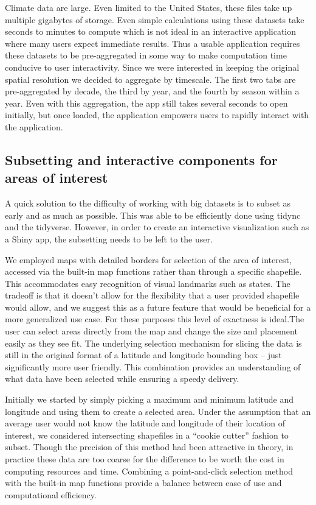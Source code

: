 \documentclass[10pt,letterpaper]{article}
\begin{document}
Climate data are large. Even limited to the United States, these files take up multiple gigabytes of storage. Even simple calculations using these datasets take seconds to minutes to compute which is not ideal in an interactive application where many users expect immediate results. Thus a usable application requires these datasets to be pre-aggregated in some way to make computation time conducive to user interactivity. Since we were interested in keeping the original spatial resolution we decided to aggregate by timescale. The first two tabs are pre-aggregated by decade, the third by year, and the fourth by season within a year. Even with this aggregation, the app still takes several seconds to open initially, but once loaded, the application empowers users to rapidly interact with the application.



\subsection*{Subsetting and interactive components for areas of interest}

A quick solution to the difficulty of working with big datasets is to subset as early and as much as possible. This was able to be efficiently done using tidync\cite{tidync} and the tidyverse\cite{tidyverse}. However, in order to create an interactive visualization such as a Shiny app, the subsetting needs to be left to the user.

We employed maps with detailed borders for selection of the area of interest, accessed via the built-in map functions\cite{maps} rather than through a specific shapefile. This accommodates easy recognition of visual landmarks such as states. The tradeoff is that it doesn’t allow for the flexibility that a user provided shapefile would allow, and we suggest this as a future feature that would be beneficial for a more generalized use case. For these purposes this level of exactness is ideal.The user can select areas directly from the map and change the size and placement easily as they see fit. The underlying selection mechanism for slicing the data is still in the original format of a latitude and longitude bounding box –  just significantly more user friendly. This combination provides an understanding of what data have been selected while ensuring a speedy delivery.

Initially we started by simply picking a maximum and minimum latitude and longitude and using them to create a selected area. Under the assumption that an average user would not know the latitude and longitude of their location of interest, we considered intersecting shapefiles in a “cookie cutter” fashion to subset. Though the precision of this method had been attractive in theory, in practice these data are too coarse for the difference to be worth the cost in computing resources and time. Combining a point-and-click selection method with the built-in map functions provide a balance between ease of use and computational efficiency.
\end{document}
